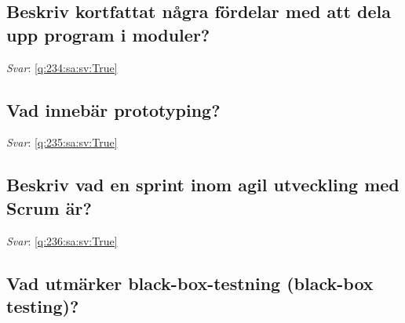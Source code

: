 \documentclass[a4paper,11pt,oneside]{article}
\begin{document}
\begin{sloppypar}
\subsection{Beskriv kortfattat n\r{a}gra f\"ordelar med att dela upp program i moduler?}

\label{q:234:sa:sv:False}

\vspace{2cm}

\noindent\makebox[\textwidth]{\hrulefill}

\vspace{1cm}

\textit{Svar}: \autoref{q:234:sa:sv:True}



\subsection{Vad inneb\"ar prototyping?}

\label{q:235:sa:sv:False}

\vspace{2cm}

\noindent\makebox[\textwidth]{\hrulefill}

\vspace{1cm}

\textit{Svar}: \autoref{q:235:sa:sv:True}



\subsection{Beskriv vad en sprint inom agil utveckling med Scrum \"ar?}

\label{q:236:sa:sv:False}

\vspace{2cm}

\noindent\makebox[\textwidth]{\hrulefill}

\vspace{1cm}

\textit{Svar}: \autoref{q:236:sa:sv:True}



\subsection{Vad utm\"arker black-box-testning (black-box testing)?}

\label{q:237:sa:sv:False}

\vspace{2cm}


\end{sloppypar}
\end{document}
